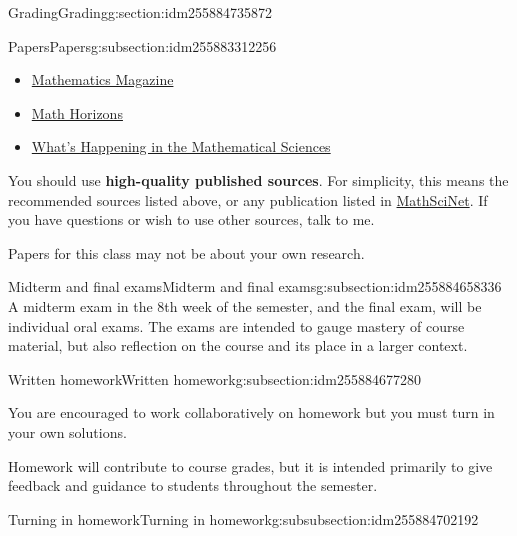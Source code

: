 \documentclass[oneside,10pt,]{article}
\newcommand{\terminology}[1]{\textbf{#1}}
\begin{document}
\begin{sectionptx}{Grading}{}{Grading}{}{}{g:section:idm255884735872}
\begin{subsectionptx}{Papers}{}{Papers}{}{}{g:subsection:idm255883312256}
\begin{itemize}[label=\textbullet]
\item{}\href{https://www-jstor-org.libproxy.boisestate.edu/journal/mathmaga}{Mathematics Magazine}%
\item{}\href{https://www-jstor-org.libproxy.boisestate.edu/journal/mathhorizons}{Math Horizons}%
\item{}\href{https://catalog.boisestate.edu/vwebv/holdingsInfo?bibId=358134}{What's Happening in the Mathematical Sciences}%
\end{itemize}
%
\par
You should use \terminology{high-quality published sources}. For simplicity, this means the recommended sources listed above, or any publication listed in \href{https://mathscinet.ams.org}{MathSciNet}. If you have questions or wish to use other sources, talk to me.%
\par
Papers for this class may not be about your own research.%
\end{subsectionptx}
%
%
\typeout{************************************************}
\typeout{************************************************}
%
\begin{subsectionptx}{Midterm and final exams}{}{Midterm and final exams}{}{}{g:subsection:idm255884658336}
A midterm exam in the 8th week of the semester, and the final exam, will be individual oral exams. The exams are intended to gauge mastery of course material, but also reflection on the course and its place in a larger context.%
\end{subsectionptx}
%
%
\typeout{************************************************}
\typeout{************************************************}
%
\begin{subsectionptx}{Written homework}{}{Written homework}{}{}{g:subsection:idm255884677280}
\begin{introduction}{}%
You are encouraged to work collaboratively on homework but you must turn in your own solutions.%
\par
Homework will contribute to course grades, but it is intended primarily to give feedback and guidance to students throughout the semester.%
\end{introduction}%
%
%
\typeout{************************************************}
\typeout{************************************************}
%
\begin{subsubsectionptx}{Turning in homework}{}{Turning in homework}{}{}{g:subsubsection:idm255884702192}

\end{subsubsectionptx}
\end{subsectionptx}
\end{sectionptx}
\end{document}
